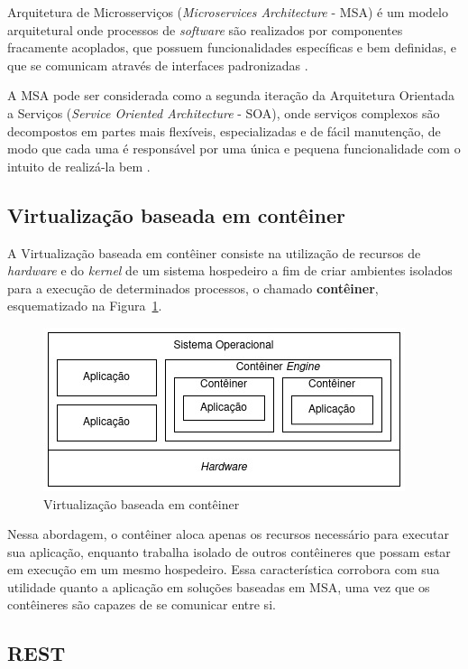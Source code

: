 \documentclass[12pt]{article}
\begin{document}
Arquitetura de Microsserviços (\textit{Microservices Architecture} - MSA) é um modelo arquitetural onde processos de \textit{software} são realizados por componentes fracamente acoplados, que possuem funcionalidades específicas e bem definidas, e que se comunicam através de interfaces padronizadas \cite{viggiato2018}.

A MSA pode ser considerada como a segunda iteração da Arquitetura Orientada a Serviços (\textit{Service Oriented Architecture} - SOA), onde serviços complexos são decompostos em partes mais flexíveis, especializadas e de fácil manutenção, de modo que cada uma é responsável por uma única e pequena funcionalidade com o intuito de realizá-la bem \cite{homay2019}. 

\subsection{Virtualização baseada em contêiner}

A Virtualização baseada em contêiner \cite{eder2016} consiste na utilização de recursos de \textit{hardware} e do \textit{kernel} de um sistema hospedeiro a fim de criar ambientes isolados para a execução de determinados processos, o chamado \textbf{contêiner}, esquematizado na Figura~\ref{fig:conteiner}.

\begin{figure}[ht]
	\centering
	\includegraphics[width=.8\textwidth]{conteiner.jpg}
	\caption{Virtualização baseada em contêiner}
	\label{fig:conteiner}
\end{figure} 

Nessa abordagem, o contêiner aloca apenas os recursos necessário para executar sua aplicação, enquanto trabalha isolado de outros contêineres que possam estar em execução em um mesmo hospedeiro. Essa característica corrobora com sua utilidade quanto a aplicação em soluções baseadas em MSA, uma vez que os contêineres são capazes de se comunicar entre si.

\subsection{REST}
\end{document}
